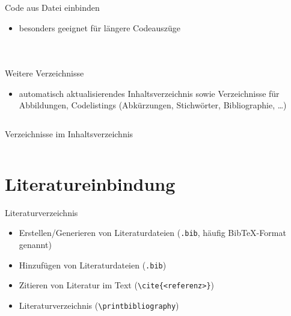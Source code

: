 \documentclass[presentation,aspectratio=169]{beamer}
\begin{document}
\begin{frame}[fragile]{Code aus Datei einbinden}
  \begin{itemize}
    \item besonders geeignet für längere Codeauszüge
  \end{itemize}
  \begin{columns}
    \begin{column}{.4\textwidth}
      
    \end{column}
    \begin{column}{.5\textwidth}
      \inputminted{latex}{codebeispiele/listings-from-file.tex}
    \end{column}
  \end{columns}
\end{frame}

\begin{frame}[fragile]{Weitere Verzeichnisse}
  \begin{itemize}
    \item automatisch aktualisierendes Inhaltsverzeichnis sowie Verzeichnisse für Abbildungen, Codelistings (Abkürzungen, Stichwörter, Bibliographie, \dots)
  \end{itemize}
  \inputminted{latex}{codebeispiele/list-of-everything.tex}
\end{frame}

\begin{frame}[fragile]{Verzeichnisse im Inhaltsverzeichnis}
  \inputminted{latex}{codebeispiele/lists-in-toc.tex}
\end{frame}

\section{Literatureinbindung}

\begin{frame}[fragile]{Literaturverzeichnis}
  \begin{itemize}
    \item Erstellen/Generieren von Literaturdateien (\verb|.bib|, häufig Bib\TeX{}-Format genannt)
    \item Hinzufügen von Literaturdateien (\verb|.bib|)
    \item Zitieren von Literatur im Text (\verb|\cite{<referenz>}|)
    \item Literaturverzeichnis (\verb|\printbibliography|)
  \end{itemize}
\end{frame}
\end{document}
